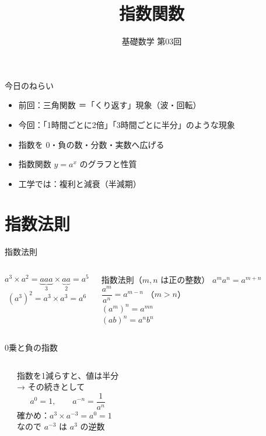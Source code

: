 \documentclass[aspectratio=169]{beamer}
\title{指数関数}
\subtitle{基礎数学 第03回}
\author{}
\date{}
\begin{document}
\begin{frame}
  \titlepage
\end{frame}

\begin{frame}{今日のねらい}
  \medskip
  \begin{itemize}
    \item 前回：三角関数 ＝「くり返す」現象（波・回転）
    \item 今回：「1時間ごとに2倍」「3時間ごとに半分」のような現象
    \item 指数を 0・負の数・分数・実数へ広げる
    \item 指数関数 $y = a^x$ のグラフと性質
    \item 工学では：複利と減衰（半減期）
  \end{itemize}
\end{frame}

\section{指数法則}

\begin{frame}{指数法則}
  \begin{columns}[c]
      \[
        a^3 \times a^2 = \underbrace{aaa}_{3} \times \underbrace{aa}_{2} = a^{5}
      \]
      \[
        (a^3)^2 = a^3 \times a^3 = a^{6}
      \]
      \begin{block}{指数法則（$m, n$ は正の整数）}
        $a^m a^n = a^{m+n}$ \\[0.6ex]
        $\dfrac{a^m}{a^n} = a^{m-n}$ \quad （$m > n$）\\[0.6ex]
        $(a^m)^n = a^{mn}$ \\[0.6ex]
        $(ab)^n = a^n b^n$
      \end{block}
  \end{columns}
\end{frame}

\begin{frame}{0乗と負の指数}
  \begin{columns}[c]
      \begin{center}
        
      \end{center}
      指数を1減らすと、値は半分\\[0.5ex]
      → その続きとして
      \[
        a^0 = 1, \qquad a^{-n} = \frac{1}{a^n}
      \]
      {\small 確かめ：$a^3 \times a^{-3} = a^{0} = 1$\\
      なので $a^{-3}$ は $a^3$ の逆数}
  \end{columns}
\end{frame}
\end{document}
